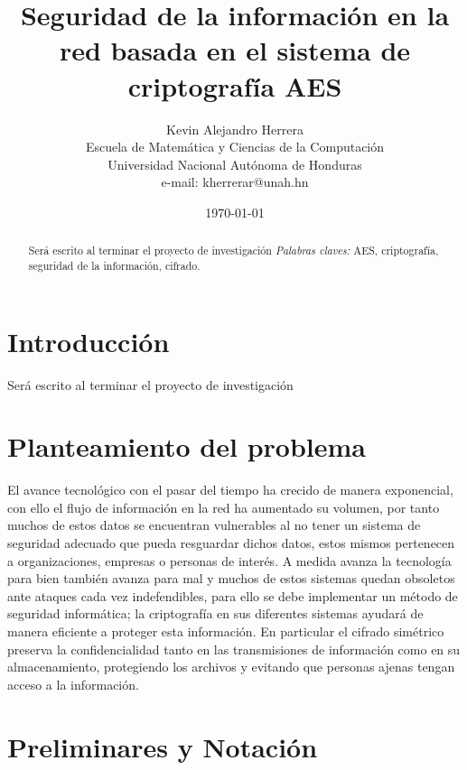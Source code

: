\documentclass[peerreview]{IEEEtran}
\begin{document}
\title{Seguridad de la información en la red basada en el sistema de
  criptografía AES}

\author{Kevin Alejandro Herrera\\
  Escuela de Matemática y Ciencias de la Computación\\
  Universidad Nacional Aut\'onoma de Honduras\\
  e-mail: kherrerar@unah.hn
}
\date{\today}

\maketitle
\tableofcontents
\listoffigures
\listoftables

\IEEEpeerreviewmaketitle{}
\begin{abstract}
  Será escrito al terminar el proyecto de investigación
  \bigbreak{}
  \textit{Palabras claves:} AES, criptografía, seguridad de la información,
  cifrado.
\end{abstract}

\section{Introducci\'on}
Será escrito al terminar el proyecto de investigación

\section{Planteamiento del problema}
El avance tecnológico con el pasar del tiempo ha crecido de manera
exponencial, con ello el flujo de información en la red ha aumentado su
volumen, por tanto muchos de estos datos se encuentran vulnerables al no tener
un sistema de seguridad adecuado que pueda resguardar dichos datos, estos
mismos pertenecen a organizaciones, empresas o personas de interés.
\bigbreak{}
A medida avanza la tecnología para bien también avanza para mal y muchos de
estos sistemas quedan obsoletos ante ataques cada vez indefendibles, para ello
se debe implementar un método de seguridad informática; la criptografía en sus
diferentes sistemas ayudará de manera eficiente a proteger esta información.
\bigbreak{}
En particular el cifrado simétrico preserva la confidencialidad tanto en las
transmisiones de información como en su almacenamiento, protegiendo los
archivos y evitando que personas ajenas tengan acceso a la información.

\section{Preliminares y Notaci\'on}
\end{document}
